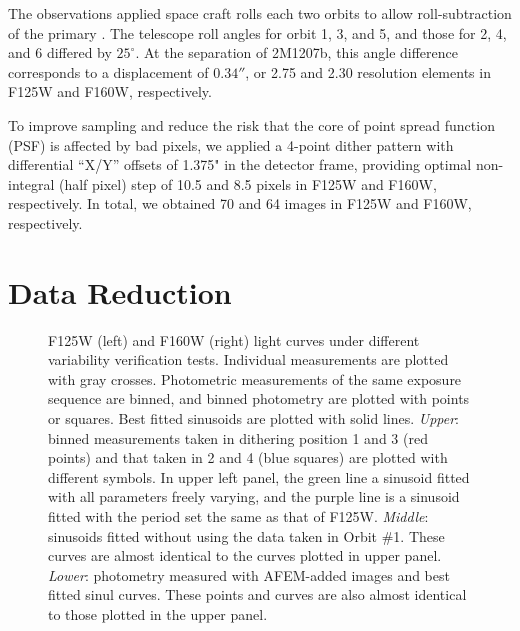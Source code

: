 \documentclass[apj]{emulateapj}
\newcommand{\reviseTwo}[1]{\textbf{{\color{cyan}{#1}}}}
\begin{document}
The observations applied space craft rolls each two orbits to allow
roll-subtraction of the primary \citep[e.g.][]{Song2006}. The
telescope roll angles for orbit 1, 3, and 5, and those for 2, 4, and 6
differed by $25^{\circ}$. At the separation of 2M1207b, this angle
difference corresponds to a displacement of $0.34''$, or 2.75 and 2.30
resolution elements in F125W and F160W, respectively.

\reviseTwo{In each orbit, we used the visibility of 2380s, which allowed us
  to take eight SPARS10 exposure sequences
  alternating between the F125W and F160W filter. Each sequence contained
  2--3 identical exposures of 88.4 s with 10 non-destructive read-outs. The number of exposures were limited by
  time spent on filter switching and transferring the data from the
  instrument to the data processing computer.} To improve sampling and reduce the risk
that the core of point spread function (PSF) is affected by bad
pixels, we applied a 4-point dither pattern with differential ``X/Y''
offsets of 1.375" in the detector frame, providing optimal
non-integral (half pixel) step of 10.5 and 8.5 pixels in F125W and
F160W, respectively. In total, we obtained 70 and 64 images  in
F125W and F160W, respectively.

\section{Data Reduction}

 \begin{figure}
  \centering
  \caption{F125W (left) and F160W (right) light curves under different
    variability verification tests. Individual measurements are
    plotted with gray crosses. Photometric measurements of the same
    exposure sequence are binned, and binned photometry are plotted
    with points or squares. Best fitted sinusoids are plotted with
    solid lines. {\em Upper}: binned measurements taken in dithering
    position 1 and 3 (red points) and that taken in 2 and 4 (blue
    squares) are plotted with different symbols. \reviseTwo{The two halves
      of data were reduced independently, and show the same modulation
      trend.} In upper left panel, the green line a sinusoid fitted
    with all parameters freely varying, and the purple line is a
    sinusoid fitted with the period set the same as that of
    F125W. {\em Middle}: sinusoids fitted without using the data taken
    in Orbit \#1. These curves are almost identical to the curves
    plotted in upper panel. {\em Lower}: photometry measured with
    AFEM-added images and best fitted sinul curves. These points and
    curves are also almost identical to those plotted in the upper
    panel. \reviseTwo{The slight difference of normalized photometry
      among panels for the same filters is the result that
      normalization factors change when omitting the first orbit or when
      adding artificial noise.}}
  \label{fig:2}
  
\end{figure}
\end{document}
